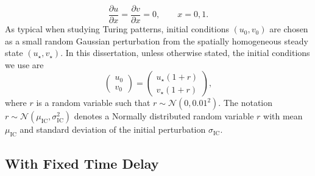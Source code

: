 \begin{equation}\label{neumannbc}
    \frac{\partial u}{\partial x}=\frac{\partial v}{\partial x}=0, \quad \quad x=0,1.
\end{equation}
As typical when studying Turing patterns, initial conditions $(u_0,v_0)$ are chosen as a small random Gaussian perturbation from the spatially homogeneous steady state $(u_\star,v_\star)$. In this dissertation, unless otherwise stated, the initial conditions we use are
\begin{equation}\label{firstic}
\begin{pmatrix}u_0\\v_0\end{pmatrix}=\begin{pmatrix}u_\star(1+r)\\v_\star(1+r)\end{pmatrix},
\end{equation}
where $r$ is a random variable such that $r\sim\mathcal{N}\left(0,0.01^2\right)$. The notation $r\sim\mathcal{N}\left(\mu_{\text{IC}},\sigma_{\text{IC}}^2\right)$ denotes a Normally distributed random variable $r$ with mean $\mu_{\text{IC}}$ and standard deviation of the initial perturbation $\sigma_{\text{IC}}$.

\subsection{With Fixed Time Delay}\label{section:fixedeq}

